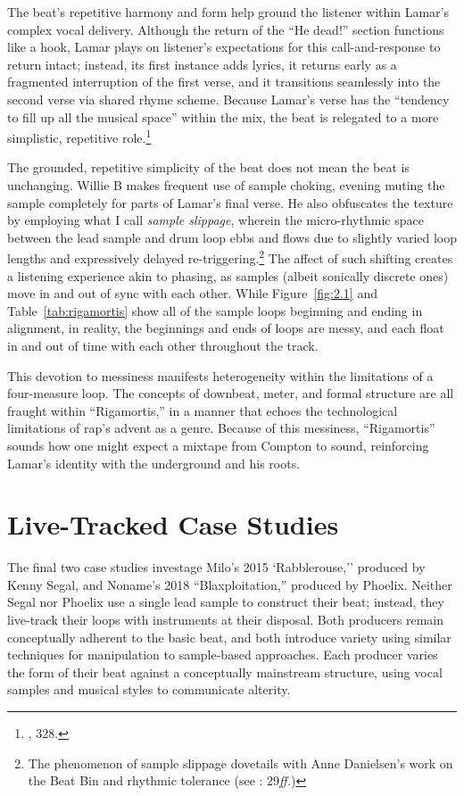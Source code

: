 The beat's repetitive harmony and form help ground the listener within Lamar's complex vocal delivery. Although the return of the ``He dead!'' section functions like a hook, Lamar plays on listener's expectations for this call-and-response to return intact; instead, its first instance adds lyrics, it returns early as a fragmented interruption of the first verse, and it transitions seamlessly into the second verse via shared rhyme scheme. Because Lamar's verse has the ``tendency to fill up all the musical space'' within the mix,  the beat is relegated to a more simplistic, repetitive role.\footnote{\cite{ollywilsonHeterogeneousSoundIdeal1992}, 328.}

The grounded, repetitive simplicity of the beat does not mean the beat is unchanging. Willie B makes frequent use of sample choking, evening muting the sample completely for parts of Lamar's final verse. He also obfuscates the texture by employing what I call \emph{sample slippage}, wherein the micro-rhythmic space between the lead sample and drum loop ebbs and flows due to slightly varied loop lengths and expressively delayed re-triggering.\footnote{The phenomenon of sample slippage dovetails with Anne Danielsen's work on the Beat Bin and rhythmic tolerance (see \cite{annedanielsenHereThereEverywhere2016}: 29\textit{ff.})} The affect of such shifting creates a listening experience akin to phasing, as samples (albeit sonically discrete ones) move in and out of sync with each other.  While Figure~\ref{fig:2.1} and Table~\ref{tab:rigamortis} show all of the sample loops beginning and ending in alignment, in reality, the beginnings and ends of loops are messy, and each float in and out of time with each other throughout the track.

This devotion to messiness manifests heterogeneity within the limitations of a four-measure loop. The concepts of downbeat, meter, and formal structure are all fraught within ``Rigamortis,'' in a manner that echoes the technological limitations of rap's advent as a genre. Because of this messiness, ``Rigamortis'' sounds how one might expect a mixtape from Compton to sound, reinforcing Lamar's identity with the underground and his roots.


\section{Live-Tracked Case Studies}
The final two case studies investage Milo's 2015 `Rabblerouse,'' produced by Kenny Segal, and Noname's 2018 ``Blaxploitation,'' produced by Phoelix. Neither Segal nor Phoelix use a single lead sample to construct their beat; instead, they live-track their loops with instruments at their disposal. Both producers remain conceptually adherent to the basic beat, and both introduce variety using similar techniques for manipulation to sample-based approaches. Each producer varies the form of their beat against a conceptually mainstream structure, using vocal samples and musical styles to communicate alterity.

